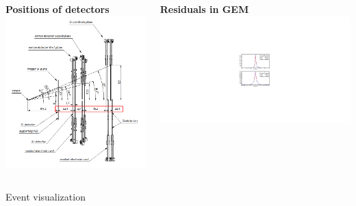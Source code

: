 \documentclass[dvipsnames, aspectratio=43] {beamer}
\begin{document}
\begin{frame}
\begin{columns}[c]
\begin{block}{\bf \centering Positions of detectors}
      \includegraphics[width=1.\linewidth]{si_scheme.png}
    \end{block}
    \begin{block}{\bf \centering Residuals in GEM}
       \includegraphics[width=1.\linewidth]{alignResid.pdf}
    \end{block}
  \end{columns}
\end{frame}

\begin{frame}
  \bf
  \begin{block}{}
    \begin{center}
      {\Huge Event visualization}
    \end{center}
  \end{block}
\end{frame}
\end{document}
